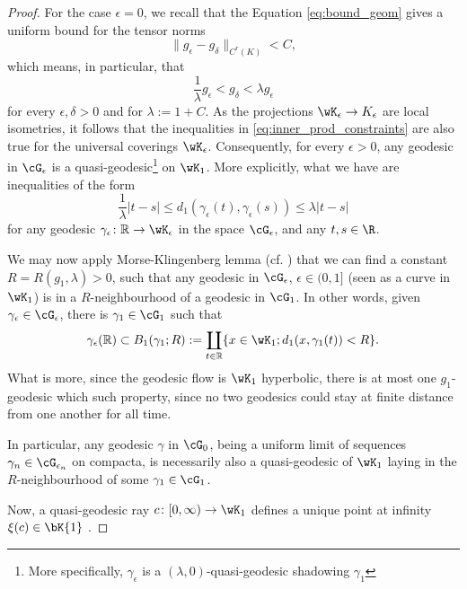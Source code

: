 \documentclass[reqno,11pt]{amsart}
\begin{document}
\begin{proof}
    \par For the case \(\epsilon = 0\), we recall that the Equation \eqref{eq:bound_geom} gives a uniform bound for the tensor norms
    \[
        \|g_\epsilon - g_\delta\|_{C^r(K)} < C, 
    \]
    which means, in particular, that
    \begin{equation}\label{eq:inner_prod_constraints}
        \frac{1}{\lambda}g_\epsilon < g_\delta < \lambda g_\epsilon
    \end{equation}   
    for every \(\epsilon, \delta > 0\) and for \(\lambda:= 1+C\).
    As the projections \( \wK_\epsilon \to K_\epsilon\) are local isometries, it follows that the inequalities in \eqref{eq:inner_prod_constraints} are also true for the universal coverings \(\wK_\epsilon\).
    Consequently, for every \(\epsilon > 0\), any geodesic in \(\cG_\epsilon\) is a quasi-geodesic\footnote{
        More specifically, \(\gamma_\epsilon\) is a \((\lambda, 0)\)-quasi-geodesic shadowing \(\gamma_1\)
    } on \(\wK_1\). 
    More explicitly, what we have are inequalities of the form
    \[
        \frac{1}{\lambda}|t - s| \leq d_1(\gamma_\epsilon(t), \gamma_\epsilon(s)) \leq \lambda|t - s|
    \]
    for any geodesic \(\gamma_\epsilon\colon \mathbb{R} \to \wK_\epsilon\) in the space \(\cG_\epsilon\), and any \(t,s \in \R\).
    \par We may now apply Morse-Klingenberg lemma (cf. \cite[Theorem III.1.7]{bridson2011metric}) that we can find a constant \(R = R(g_1, \lambda) > 0\), such that any geodesic in \(\cG_\epsilon\), \(\epsilon \in (0, 1]\) (seen as a curve in \(\wK_1\)) is in a \(R\)-neighbourhood of a geodesic in \(\cG_1\).
    In other words, given \(\gamma_\epsilon \in \cG_\epsilon\), there is \(\gamma_1 \in \cG_1\) such that
    \[
        \gamma_\epsilon(\mathbb{R}) \subset B_1(\gamma_1; R) := \coprod_{t \in \mathbb{R}}\{x \in \wK_1; d_1(x, \gamma_1(t)) < R\}.
    \]
    What is more, since the geodesic flow is \(\wK_1\) hyperbolic, there is at most one \(g_1\)-geodesic which such property, since no two geodesics could stay at finite distance from one another for all time.
    \par In particular, any geodesic \(\gamma\) in \(\cG_0\), being a uniform limit of sequences \(\gamma_n \in \cG_{\epsilon_n}\) on compacta, is necessarily also a quasi-geodesic of \(\wK_1\) laying in the \(R\)-neighbourhood of some \(\gamma_1 \in \cG_1\).
    \par Now, a quasi-geodesic ray \(c\colon [0, \infty) \to \wK_1\) defines a unique point at infinity \(\xi(c) \in \bK{1}\) \cite[Lemma III.H.3.1]{bridson2011metric}.

\end{proof}
\end{document}
